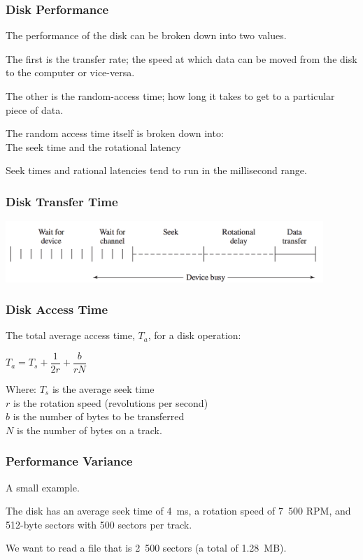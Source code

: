 \begin{frame}
\frametitle{Disk Performance}

The performance of the disk can be broken down into two values. 

The first is the \alert{transfer rate}; the speed at which data can be moved from the disk to the computer or vice-versa. 

The other is the \alert{random-access time}; how long it takes to get to a particular piece of data. 

The random access time itself is broken down into:\\
\quad The \alert{seek time} and the \alert{rotational latency}

Seek times and rational latencies tend to run in the millisecond range.


\end{frame}

\begin{frame}
\frametitle{Disk Transfer Time}

\begin{center}
	\includegraphics[width=0.9\textwidth]{images/disk-transfer-time.png}
\end{center}


\end{frame}

\begin{frame}
\frametitle{Disk Access Time}

The total average access time, $T_{a}$, for a disk operation:

\begin{center}
$T_{a} = T_{s} + \dfrac{1}{2r} + \dfrac{b}{rN}$
\end{center}

Where: $T_{s}$ is the average seek time\\
\quad $r$ is the rotation speed (revolutions per second)\\
\quad $b$ is the number of bytes to be transferred\\ 
\quad $N$ is the number of bytes on a track.


\end{frame}

\begin{frame}
\frametitle{Performance Variance}

A small example.

The disk has an average seek time of 4~ms, a rotation speed of 7~500 RPM, and 512-byte sectors with 500 sectors per track. 

We want to read a file that is 2~500 sectors (a total of 1.28~MB). 

\end{frame}

